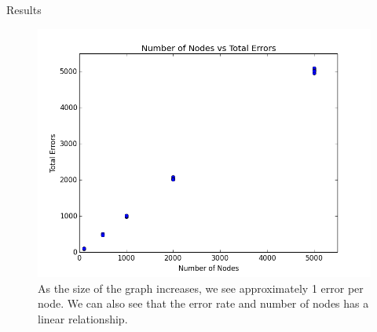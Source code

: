 \documentclass[11pt]{beamer}
\begin{document}
\begin{frame}{Results}
	\begin{figure}
		\centering
		\includegraphics[width=0.5\linewidth]{figs/error_rate}
		\caption{As the size of the graph increases, we see approximately 1 error per node.
		We can also see that the error rate and number of nodes has a linear relationship.}
		\label{exp_0}
	\end{figure}
\end{frame}
\end{document}

